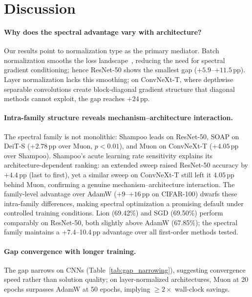 \section{Discussion}
\label{sec:discussion}

\paragraph{Why does the spectral advantage vary with architecture?}
Our results point to normalization type as the primary mediator.
Batch normalization smooths the loss landscape~\cite{santurkar2018how}, reducing the need for spectral gradient conditioning; hence ResNet-50 shows the smallest gap ($+5.9$--$+11.5$\,pp).
Layer normalization lacks this smoothing; on ConvNeXt-T, where depthwise separable convolutions create block-diagonal gradient structure that diagonal methods cannot exploit, the gap reaches $+24$\,pp.

\paragraph{Intra-family structure reveals mechanism--architecture interaction.}
The spectral family is not monolithic: Shampoo leads on ResNet-50, SOAP on DeiT-S ($+2.78$\,pp over Muon, $p < 0.01$), and Muon on ConvNeXt-T ($+4.05$\,pp over Shampoo).
Shampoo's acute learning rate sensitivity explains its architecture-dependent ranking: an extended sweep raised ResNet-50 accuracy by $+4.4$\,pp (last to first), yet a similar sweep on ConvNeXt-T still left it $4.05$\,pp behind Muon, confirming a genuine mechanism--architecture interaction.
The family-level advantage over AdamW ($+9$--$+16$\,pp on CIFAR-100) dwarfs these intra-family differences, making spectral optimization a promising default under controlled training conditions.
Lion (69.42\%) and SGD (69.50\%) perform comparably on ResNet-50, both slightly above AdamW (67.85\%); the spectral family maintains a +7.4--10.4\,pp advantage over all first-order methods tested.

\paragraph{Gap convergence with longer training.}
The gap narrows on CNNs (Table~\ref{tab:gap_narrowing}), suggesting convergence speed rather than solution quality; on layer-normalized architectures, Muon at 20 epochs surpasses AdamW at 50 epochs, implying ${\geq}2\times$ wall-clock savings.

